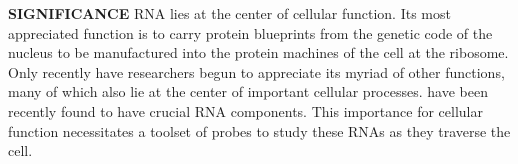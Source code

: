 
\textbf{SIGNIFICANCE}
RNA lies at the center of cellular function. Its most appreciated function is to carry protein blueprints from the genetic code of the nucleus to be manufactured into the protein machines of the cell at the ribosome. Only recently have researchers begun to appreciate its myriad of other functions, many of which also lie at the center of important cellular processes.  have been recently found to have crucial RNA components.
This importance for cellular function necessitates a toolset of probes to study these RNAs as they traverse the cell.

